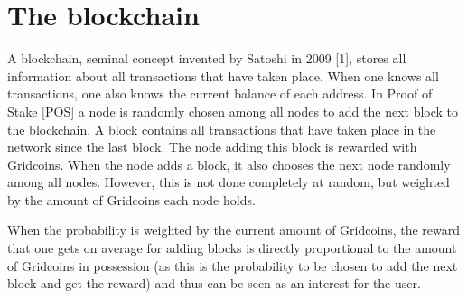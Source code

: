 \section{The blockchain}

A blockchain, seminal concept invented by Satoshi in 2009 [1], stores all information about all transactions that have taken place. When one knows all transactions, one also knows the current balance of each address. In Proof of Stake [POS] a node is randomly chosen among all nodes to add the next block to the blockchain. A block contains all transactions that have taken place in the network since the last block. The node adding this block is rewarded with Gridcoins. When the node adds a block, it also chooses the next node randomly among all nodes. However, this is not done completely at random, but weighted by the amount of Gridcoins each node holds.

When the probability is weighted by the current amount of Gridcoins, the reward that one gets on average for adding blocks is directly proportional to the amount of Gridcoins in possession (as this is the probability to be chosen to add the next block and get the reward) and thus can be seen as an interest for the user.

